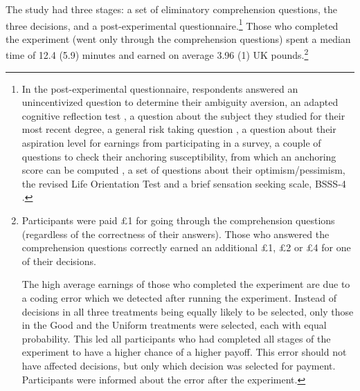 The study had three stages: a set of eliminatory comprehension questions, the three decisions, and a post-experimental questionnaire.\footnote{
In the post-experimental questionnaire, respondents answered an unincentivized question to determine their ambiguity aversion, an adapted cognitive reflection test \citep{Frederick2005,Thomson2016}, a question about the subject they studied for their most recent degree, a general risk taking question \citep{Dohmen2011}, a question about their aspiration level for earnings from participating in a survey, a couple of questions to check their anchoring susceptibility, from which an anchoring score can be computed \citep{Cheek2017}, a set of questions about their optimism/pessimism, the revised Life Orientation Test \citep{Scheier1994} and a brief sensation seeking scale, BSSS-4 \citep{Stephenson2003}.
}
Those who completed the experiment (went only through the comprehension questions) spent a median time of 12.4 (5.9) minutes and earned on average 3.96 (1) UK pounds.\footnote{
Participants were paid \pounds1 for going through the comprehension questions (regardless of the correctness of their answers).
Those who answered the comprehension questions correctly earned an additional \pounds1, \pounds2 or \pounds4 for one of their decisions.

The high average earnings of those who completed the experiment are due to a coding error which we detected after running the experiment.
Instead of decisions in all three treatments being equally likely to be selected, only those in the Good and the Uniform treatments were selected, each with equal probability.
This led all participants who had completed all stages of the experiment to have a higher chance of a higher payoff.
This error should not have affected decisions, but only which decision was selected for payment.
Participants were informed about the error after the experiment.
}



